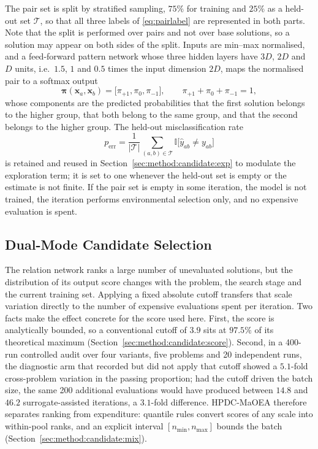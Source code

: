 \documentclass[11pt,a4paper]{article}
\newcommand{\vx}{\mathbf{x}}
\begin{document}
The pair set is split by stratified sampling, $75\%$ for training and $25\%$ as a
held-out set $\mathcal{T}$, so that all three labels of \eqref{eq:pairlabel} are
represented in both parts. Note that the split is performed over pairs and not
over base solutions, so a solution may appear on both sides of the split. Inputs
are min--max normalised, and a feed-forward pattern network whose three hidden
layers have $3D$, $2D$ and $D$ units, i.e.\ $1.5$, $1$ and $0.5$ times the input
dimension $2D$, maps the normalised pair to a softmax output
\begin{equation}
\bm{\pi}(\vx_a,\vx_b)
=\bigl[\pi_{+1},\pi_0,\pi_{-1}\bigr],
\qquad
\pi_{+1}+\pi_0+\pi_{-1}=1 ,
\label{eq:netout}
\end{equation}
whose components are the predicted probabilities that the first solution belongs
to the higher group, that both belong to the same group, and that the second
belongs to the higher group. The held-out misclassification rate
\begin{equation}
p_{\mathrm{err}}
=\frac{1}{|\mathcal{T}|}
\sum_{(a,b)\in\mathcal{T}}
\mathbb{I}\bigl[\hat y_{ab}\neq y_{ab}\bigr]
\label{eq:perr}
\end{equation}
is retained and reused in Section~\ref{sec:method:candidate:exp} to modulate the
exploration term; it is set to one whenever the held-out set is empty or the
estimate is not finite. If the pair set is empty in some iteration, the model is
not trained, the iteration performs environmental selection only, and no
expensive evaluation is spent.

\subsection{Dual-Mode Candidate Selection}
\label{sec:method:candidate}

The relation network ranks a large number of unevaluated solutions, but the
distribution of its output score changes with the problem, the search stage and
the current training set. Applying a fixed absolute cutoff transfers that scale
variation directly to the number of expensive evaluations spent per iteration.
Two facts make the effect concrete for the score used here. First, the score is
analytically bounded, so a conventional cutoff of $3.9$ sits at $97.5\%$ of its
theoretical maximum (Section~\ref{sec:method:candidate:score}). Second, in a
400-run controlled audit over four variants, five problems and 20 independent
runs, the diagnostic arm that recorded but did not apply that cutoff showed a
$5.1$-fold cross-problem variation in the passing proportion; had the cutoff
driven the batch size, the same 200 additional evaluations would have produced
between $14.8$ and $46.2$ surrogate-assisted iterations, a $3.1$-fold
difference. HPDC-MaOEA therefore separates ranking from expenditure: quantile
rules convert scores of any scale into within-pool ranks, and an explicit
interval $[n_{\min},n_{\max}]$ bounds the batch
(Section~\ref{sec:method:candidate:mix}).
\end{document}
